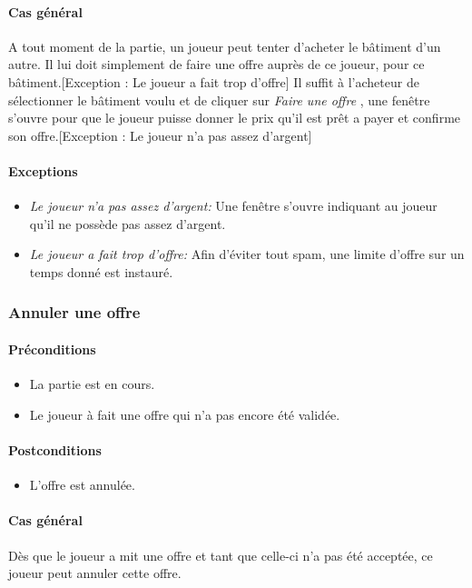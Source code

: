 \documentclass[a4paper,11pt]{report}
\begin{document}
\paragraph{Cas général}
A tout moment de la partie, un joueur peut tenter d'acheter le bâtiment d'un autre. Il lui doit simplement de faire une offre auprès de ce joueur, pour ce bâtiment.[Exception : Le joueur a fait trop d'offre] Il suffit à l'acheteur de sélectionner le bâtiment voulu et de cliquer sur \og \textit{Faire une offre} \fg, une fenêtre s'ouvre pour que le joueur puisse donner le prix qu'il est prêt a payer et confirme son offre.[Exception : Le joueur n'a pas assez d'argent] 
\paragraph{Exceptions}
\begin{itemize}
 \item \textit{Le joueur n'a pas assez d'argent:} Une fenêtre s'ouvre indiquant au joueur qu'il ne possède pas assez d'argent.
 \item \textit{Le joueur a fait trop d'offre:} Afin d'éviter tout spam, une limite d'offre sur un temps donné est instauré.
\end{itemize}
\subsubsection{Annuler une offre}
\paragraph{Préconditions}
\begin{itemize}
 \item La partie est en cours.
 \item Le joueur à fait une offre qui n'a pas encore été validée.
\end{itemize}
\paragraph{Postconditions}
\begin{itemize}
 \item L'offre est annulée.
\end{itemize}
\paragraph{Cas général}
Dès que le joueur a mit une offre et tant que celle-ci n'a pas été acceptée, ce joueur peut annuler cette offre.
\end{document}
